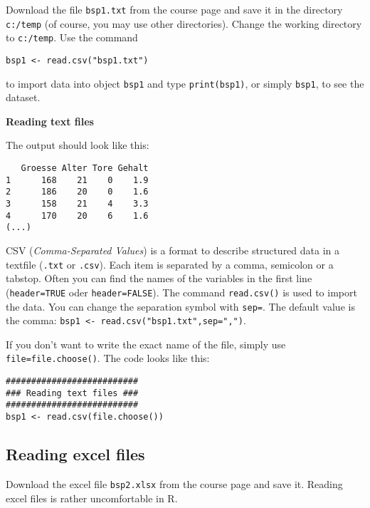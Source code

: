 \documentclass{article}
\begin{document}
Download the file \texttt{bsp1.txt} from the course page and save it in the directory \texttt{c:/temp} (of course, you may use other directories).
Change the working directory to \texttt{c:/temp}. Use the command

\texttt{bsp1 <- read.csv("bsp1.txt")}

to import data into object \texttt{bsp1} and type \texttt{print(bsp1)}, or simply \texttt{bsp1}, to see the dataset.

\begin{solution}
\textbf{Reading text files}

The output should look like this:
\begin{verbatim}
   Groesse Alter Tore Gehalt
1      168    21    0    1.9
2      186    20    0    1.6
3      158    21    4    3.3
4      170    20    6    1.6
(...)
\end{verbatim}
CSV (\emph{Comma-Separated Values}) is a format to describe structured data in a textfile (\texttt{.txt} or \texttt{.csv}). Each item is separated by a comma, semicolon or a tabstop. Often you can find the names of the variables in the first line (\texttt{header=TRUE} oder \texttt{header=FALSE}). The command \texttt{read.csv()} is used to import the data. You can change the separation symbol with \texttt{sep=}. The default value is the comma: \texttt{bsp1 <- read.csv("bsp1.txt",sep=",")}.

If you don't want to write the exact name of the file, simply use \texttt{file=file.choose()}. The code looks like this:
\begin{verbatim}
##########################
### Reading text files ###
##########################
bsp1 <- read.csv(file.choose())
\end{verbatim}
\end{solution}

\subsection{Reading excel files}

Download the excel file \texttt{bsp2.xlsx} from the course page and save it. Reading excel files is rather uncomfortable in R.
\end{document}

